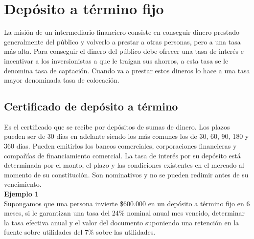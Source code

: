 \section{Depósito a término fijo}


La misión de un intermediario financiero consiste en conseguir dinero prestado generalmente del público y volverlo a prestar a otras personas, pero a una tasa más alta. Para conseguir el dinero del público debe ofrecer una tasa de interés e incentivar a los inversionistas a que le traigan sus ahorros, a esta tasa se le denomina tasa de captación. Cuando va a prestar estos dineros lo hace a una tasa mayor denominada tasa de colocación.\\

\subsection{Certificado de depósito a término}
Es el certificado que se recibe por depósitos de sumas de dinero. Los plazos pueden ser de 30 días en adelante siendo los más comunes los de 30, 60, 90, 180 y 360 días. Pueden emitirlos los bancos comerciales, corporaciones financieras y compañías de financiamiento comercial. La tasa de interés por su depósito está determinada por el monto, el plazo y las condiciones existentes en el mercado al momento de su constitución. Son nominativos y no se pueden redimir antes de su vencimiento.\\ 



\textbf{Ejemplo 1}\\

Supongamos que una persona invierte \$600.000 en un depósito a término fijo en 6 meses, si le garantizan una tasa del 24\% nominal anual mes vencido, determinar la tasa efectiva anual y el valor del documento suponiendo una retención en la fuente sobre utilidades del 7\% sobre las utilidades.\\

